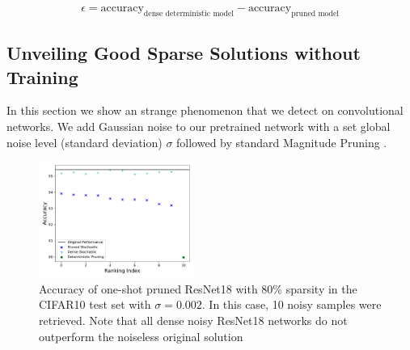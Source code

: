 
\begin{equation}
\epsilon= \text{accuracy}_{\text{dense deterministic model}}-\text{accuracy}_{\text{pruned model}}
\end{equation}

\subsection{Unveiling Good Sparse Solutions without Training}
In this section we show an strange phenomenon that we detect on convolutional networks.  
We add Gaussian noise to our pretrained network with a set global noise level (standard deviation) $\sigma$ followed by standard Magnitude Pruning \cite{citeNeedCitation200007}. 
\begin{figure}
    \centering
    \includegraphics[width=0.45\textwidth]{figures/stochastic_deterministic_gaussian_sigma_0.002_pr_0.8_batchSize_512_pop_10_t_11-44_test.pdf}
    \caption{ Accuracy of one-shot pruned ResNet18 with 80\% sparsity in the CIFAR10 test set with $\sigma = 0.002$. In this case, 10 noisy samples were retrieved. Note that all dense noisy ResNet18 networks do not outperform the noiseless 
    original solution}
    \label{fig:stochastic_versus_deterministic}
\end{figure}

